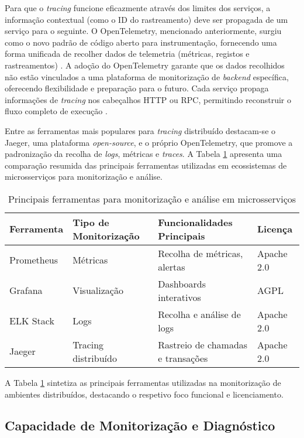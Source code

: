 Para que o \textit{tracing} funcione eficazmente através dos limites dos serviços, a informação contextual (como o ID do rastreamento) deve ser propagada de um serviço para o seguinte. O OpenTelemetry, mencionado anteriormente, surgiu como o novo padrão de código aberto para instrumentação, fornecendo uma forma unificada de recolher dados de telemetria (métricas, registos e rastreamentos) \cite{Thakur2022}. A adoção do OpenTelemetry garante que os dados recolhidos não estão vinculados a uma plataforma de monitorização de \textit{backend} específica, oferecendo flexibilidade e preparação para o futuro. Cada serviço propaga informações de \textit{tracing} nos cabeçalhos HTTP ou RPC, permitindo reconstruir o fluxo completo de execução \cite{Sigelman2010}.

Entre as ferramentas mais populares para \textit{tracing} distribuído destacam-se o Jaeger, uma plataforma \textit{open-source}, e o próprio OpenTelemetry, que promove a padronização da recolha de \textit{logs}, métricas e \textit{traces}. A Tabela \ref{tab:monitoring-tools} apresenta uma comparação resumida das principais ferramentas utilizadas em ecossistemas de microsserviços para monitorização e análise.

\begin{table}[h]
\centering
\caption{Principais ferramentas para monitorização e análise em microsserviços}
\label{tab:monitoring-tools}
\begin{tabular}{|l|l|l|l|}
\hline
\textbf{Ferramenta} & \textbf{Tipo de Monitorização} & \textbf{Funcionalidades Principais} & \textbf{Licença} \\ \hline
Prometheus & Métricas & Recolha de métricas, alertas & Apache 2.0 \\ \hline
Grafana & Visualização & Dashboards interativos & AGPL \\ \hline
ELK Stack & Logs & Recolha e análise de logs & Apache 2.0 \\ \hline
Jaeger & Tracing distribuído & Rastreio de chamadas e transações & Apache 2.0 \\ \hline
\end{tabular}
\end{table}

A Tabela \ref{tab:monitoring-tools} sintetiza as principais ferramentas utilizadas na monitorização de ambientes distribuídos, destacando o respetivo foco funcional e licenciamento.


\subsection{Capacidade de Monitorização e Diagnóstico}

